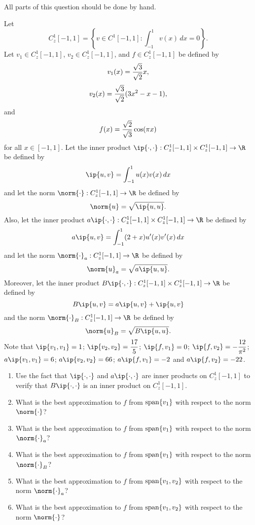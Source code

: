 
All parts of this question should be done by hand.

Let
\[
C_z^1[-1,1]=\left\{v\in C^1[-1,1]:\int_{-1}^1v(x)\,dx=0\right\}.
\]
Let $v_1\in C_z^1[-1,1]$, $v_2\in C_z^1[-1,1]$, and $f\in C_z^1[-1,1]$ be defined by
\[
v_1(x)={\sqrt{3} \over \sqrt{2}}x,
\]
\[
v_2(x)={\sqrt{3} \over \sqrt{2}}(3x^2-x-1),
\]
and
\[
f(x)={\sqrt{2} \over \sqrt{3}}\cos(\pi x)
\]
for all $x\in[-1,1]$. Let the inner product $\ip{\cdot,\cdot}:C_z^1[-1,1]\times C_z^1[-1,1]\to\R$ be defined by
\[
\ip{u,v}=\int_{-1}^1u(x)v(x)\,dx
\]
and let the norm $\norm{\cdot}:C_z^1[-1,1]\to\R$ be defined by
\[
\norm{u}=\sqrt{\ip{u,u}}.
\]
Also, let the inner product $a\ip{\cdot,\cdot}:C_z^1[-1,1]\times C_z^1[-1,1]\to\R$ be defined by
\[
a\ip{u,v}=\int_{-1}^1(2+x)u'(x)v'(x)\,dx
\]
and let the norm $\norm{\cdot}_a:C_z^1[-1,1]\to\R$ be defined by
\[
\norm{u}_a=\sqrt{a\ip{u,u}}.
\]
Moreover, let the inner product $B\ip{\cdot,\cdot}:C_z^1[-1,1]\times C_z^1[-1,1]\to\R$ be defined by
\[
B\ip{u,v}=a\ip{u,v}+\ip{u,v}
\]
and the norm $\norm{\cdot}_B:C_z^1[-1,1]\to\R$ be defined by
\[
\norm{u}_B=\sqrt{B\ip{u,u}}.
\]
Note that $\ip{v_1,v_1}=1$; $\ip{v_2,v_2}=\displaystyle{{17 \over 5}}$; $\ip{f,v_1}=0$; $\displaystyle{\ip{f,v_2}=-{12 \over \pi^2}}$; $a\ip{v_1,v_1}=6$; $a\ip{v_2,v_2}=66$; $a\ip{f,v_1}=-2$ and $a\ip{f,v_2}=-22$.
\\
\begin{enumerate}
\item Use the fact that $\ip{\cdot,\cdot}$ and $a\ip{\cdot,\cdot}$ are inner products on $C_z^1[-1,1]$ to verify that $B\ip{\cdot,\cdot}$ is an inner product on $C_z^1[-1,1]$.
\\
\item What is the best approximation to $f$ from ${\rm span}\{v_1\}$ with respect to the norm $\norm{\cdot}$?
\\
\item What is the best approximation to $f$ from ${\rm span}\{v_1\}$ with respect to the norm $\norm{\cdot}_a$?
\\
\item What is the best approximation to $f$ from ${\rm span}\{v_1\}$ with respect to the norm $\norm{\cdot}_B$?
\\
\item What is the best approximation to $f$ from ${\rm span}\{v_1,v_2\}$ with respect to the norm $\norm{\cdot}_a$?
\\
\item What is the best approximation to $f$ from ${\rm span}\{v_1,v_2\}$ with respect to the norm $\norm{\cdot}$?
\end{enumerate}



